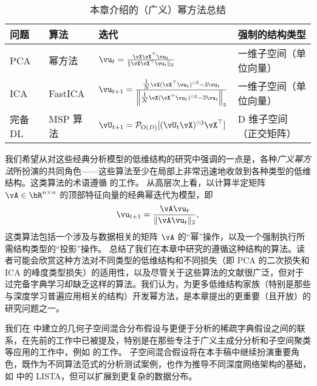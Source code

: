 \documentclass[../../book-main_zh.tex]{subfiles}
\begin{document}
\begin{table}[tb]
\centering
    \caption{本章介绍的（广义）幂方法总结}
    \label{tab:power-method-summary}
\begin{tabular}{llll}
\toprule
问题 & 算法 & 迭代 & 强制的结构类型 \\
\midrule
PCA & 幂方法 & $\vu_{t} = \frac{\vX\vX^\top
    \vu_{t}}{\norm{\vX\vX^\top \vu_{t}}_2}$ & 一维子空间（单位向量） \\
    \addlinespace
    ICA & FastICA &
    $\vu_{t+1} = \frac{\tfrac{1}{N}\vX (\vX^\top \vu_{t})^{\hada 3}-
    3 \vu_{t}}{\norm*{\tfrac{1}{N}\vX (\vX^\top \vu_{t})^{\hada 3}-
    3 \vu_{t}}_2}$
    & 一维子空间（单位向量） \\
    \addlinespace
    完备 DL & MSP 算法 &
    $\vU_{t+1} = \mathcal{P}_{\mathrm O(D)}[( {\vU_t \vX})^{\hada 3}\vX^\top]$
    & D 维子空间（正交矩阵） \\
\bottomrule
\end{tabular}
\end{table}

我们希望从对这些经典分析模型的低维结构的研究中强调的一点是，各种\textit{广义幂方法}所扮演的共同角色——这些算法至少在局部上非常迅速地收敛到各种类型的低维结构。这类算法的术语遵循 \textcite{JourneeM2010} 的工作。
从高层次上看，以计算半定矩阵 $\vA \in \bR^{n \times n}$ 的顶部特征向量的经典幂迭代为模型，即
\begin{equation}
    \vu_{t+1} = \frac{\vA \vu_{t}}{\norm{\vA \vu_{t}}_2},
\end{equation}
这类算法包括一个涉及与数据相关的矩阵 $\vA$ 的“幂”操作，以及一个强制执行所需结构类型的“投影”操作。 总结了我们在本章中研究的遵循这种结构的算法。读者可能会欣赏这种方法对不同类型的低维结构和不同损失（即 PCA 的二次损失和 ICA 的峰度类型损失）的适用性，以及尽管关于这些算法的文献很广泛，但对于过完备字典学习却缺乏这样的算法。我们认为，为更多低维结构家族（特别是那些与深度学习普遍应用相关的结构）开发幂方法，是本章提出的更重要（且开放）的研究问题之一。


我们在  中建立的几何子空间混合分布假设与更便于分析的稀疏字典假设之间的联系，在先前的工作中已被提及，特别是在那些专注于广义主成分分析和子空间聚类等应用的工作中，例如 \textcite{GPCA} 的工作。
子空间混合假设将在本手稿中继续扮演重要角色，既作为不同算法范式的分析测试案例，也作为推导不同深度网络架构的基础，如  中的 LISTA，但可以扩展到更复杂的数据分布。
\end{document}
